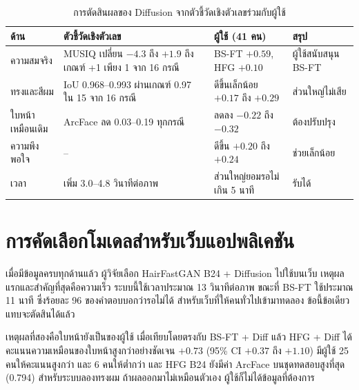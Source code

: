\begin{table}[!htbp]
\centering
\caption{การตัดสินผลของ Diffusion จากตัวชี้วัดเชิงตัวเลขร่วมกับผู้ใช้}
\label{tab:diff_decision}
\small
\begin{tabular}{|l|L{3.4cm}|L{4.6cm}|L{2.2cm}|}
\hline
\textbf{ด้าน} & \textbf{ตัวชี้วัดเชิงตัวเลข} & \textbf{ผู้ใช้ (41 คน)} & \textbf{สรุป} \\ \hline
ความสมจริง & MUSIQ เปลี่ยน $-4.3$ ถึง $+1.9$ ถึงเกณฑ์ +1 เพียง 1 จาก 16 กรณี & BS-FT $+0.59$, HFG $+0.10$ & ผู้ใช้สนับสนุน BS-FT \\ \hline
ทรงและสีผม & IoU 0.968--0.993 ผ่านเกณฑ์ 0.97 ใน 15 จาก 16 กรณี & ดีขึ้นเล็กน้อย $+0.17$ ถึง $+0.29$ & ส่วนใหญ่ไม่เสีย \\ \hline
ใบหน้าเหมือนเดิม & ArcFace ลด 0.03--0.19 ทุกกรณี & ลดลง $-0.22$ ถึง $-0.32$ & ต้องปรับปรุง \\ \hline
ความพึงพอใจ & -- & ดีขึ้น $+0.20$ ถึง $+0.24$ & ช่วยเล็กน้อย \\ \hline
เวลา & เพิ่ม 3.0--4.8 วินาทีต่อภาพ & ส่วนใหญ่ยอมรอไม่เกิน 5 นาที & รับได้ \\ \hline
\end{tabular}
\par\vspace{3pt}{\footnotesize\raggedright หมายเหตุ: MUSIQ = Multi-scale Image Quality Transformer (คะแนนคุณภาพภาพ), BS-FT (Barbershop-FT) = Barbershop ที่ปรับจูนแล้ว (Fine-tuned), HFG = HairFastGAN, IoU = Intersection over Union (สัดส่วนพื้นที่ผมที่ทับกัน), ArcFace = โมเดลจดจำใบหน้าที่ใช้วัดความเหมือนของใบหน้า\par}

\end{table}

\section{การคัดเลือกโมเดลสำหรับเว็บแอปพลิเคชัน}

เมื่อมีข้อมูลครบทุกด้านแล้ว ผู้วิจัยเลือก HairFastGAN B24 + Diffusion ไปใช้บนเว็บ
เหตุผลแรกและสำคัญที่สุดคือความเร็ว ระบบนี้ใช้เวลาประมาณ 13 วินาทีต่อภาพ
ขณะที่ BS-FT ใช้ประมาณ 11 นาที ซึ่งร้อยละ 96 ของคำตอบบอกว่ารอไม่ได้
สำหรับเว็บที่ให้คนทั่วไปเข้ามาทดลอง ข้อนี้ข้อเดียวแทบจะตัดสินได้แล้ว

เหตุผลที่สองคือใบหน้ายังเป็นของผู้ใช้ เมื่อเทียบโดยตรงกับ BS-FT + Diff แล้ว
HFG + Diff ได้คะแนนความเหมือนของใบหน้าสูงกว่าอย่างชัดเจน $+0.73$ (95\% CI $+0.37$ ถึง $+1.10$)
มีผู้ใช้ 25 คนให้คะแนนสูงกว่า และ 6 คนให้ต่ำกว่า และ HFG B24 ยังมีค่า ArcFace บนชุดทดสอบสูงที่สุด (0.794)
สำหรับระบบลองทรงผม ถ้าผลออกมาไม่เหมือนตัวเอง ผู้ใช้ก็ไม่ได้ข้อมูลที่ต้องการ

